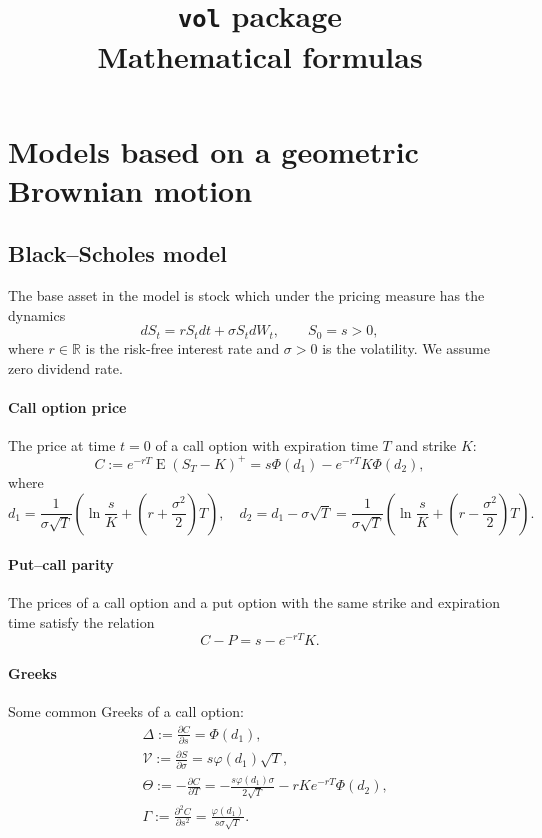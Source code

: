 \documentclass[a4paper,11pt,titlepage]{article}
\title{\bfseries {\LARGE\texttt{vol} package}\\[1em]
  \Large Mathematical formulas}
\author{}
\date{}
\newcommand{\R}{\mathbb{R}}
\newcommand{\prt}[2]{\frac{\partial{#1}}{\partial{#2}}}
\newcommand{\prtt}[2]{\frac{\partial^2{#1}}{\partial{#2}^2}}
\renewcommand{\phi}{\varphi}
\newcommand{\Vega}{\mathcal{V}}
\DeclareMathOperator{\E}{E}
\theoremstyle{remark}
\begin{document}
\maketitle

\tableofcontents\newpage

\section{Models based on a geometric Brownian motion}
\subsection{Black--Scholes model}
The base asset in the model is stock which under the pricing measure has the dynamics
\[
dS_t = rS_t dt + \sigma S_t dW_t, \qquad S_0 = s > 0,
\]
where $r\in \R$ is the risk-free interest rate and $\sigma>0$ is the volatility.
We assume zero dividend rate.

\paragraph{Call option price \citep{BlackScholes73}} 
The price at time $t=0$ of a call option with expiration time $T$ and strike $K$:
\[
C := e^{-rT} \E (S_T-K)^+ = s\Phi(d_1) - e^{-rT}K\Phi(d_2),
\]
where 
\[
d_1 = \frac{1}{\sigma\sqrt T} 
  \left( \ln\frac{s}{K} + \left(r + \frac{\sigma^2}{2} \right) T  \right),
\quad 
d_2 = d_1 - \sigma\sqrt T = \frac{1}{\sigma\sqrt T} 
  \left( \ln\frac{s}{K} + \left(r - \frac{\sigma^2}{2} \right) T \right).
\]

\paragraph{Put--call parity}
The prices of a call option and a put option with the same strike and expiration time satisfy the relation
\[
C - P = s - e^{-rT}K.
\]

\paragraph{Greeks}
Some common Greeks of a call option:
\begin{align*}
&\Delta := \prt Cs = \Phi(d_1),\\
&\Vega := \prt S\sigma = s\phi(d_1)\sqrt{T},\\
&\Theta := -\prt CT 
  = -\frac{s\phi(d_1)\sigma}{2\sqrt T} - rKe^{-rT}\Phi(d_2),\\
&\Gamma := \prtt Cs = \frac{\phi(d_1)}{s\sigma\sqrt T}.
\end{align*}
\end{document}
